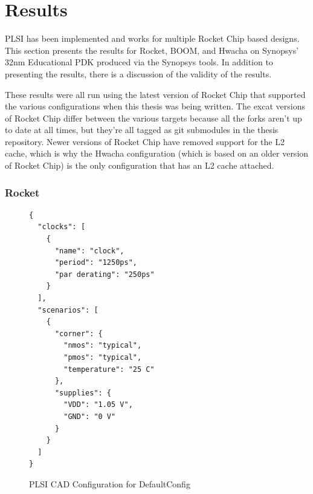 \documentclass{article}
\begin{document}
\chapter{Results}

PLSI has been implemented and works for multiple Rocket Chip based designs.
This section presents the results for Rocket, BOOM, and Hwacha on Synopsys'
32nm Educational PDK produced via the Synopsys tools.  In addition to
presenting the results, there is a discussion of the validity of the results.

These results were all run using the latest version of Rocket Chip that
supported the various configurations when this thesis was being written.  The
excat versions of Rocket Chip differ between the various targets because all
the forks aren't up to date at all times, but they're all tagged as git
submodules in the thesis repository.  Newer versions of Rocket Chip have
removed support for the L2 cache, which is why the Hwacha configuration (which
is based on an older version of Rocket Chip) is the only configuration that has
an L2 cache attached.

\subsection{Rocket}

\begin{figure}
  \begin{verbatim}
{
  "clocks": [
    {
      "name": "clock",
      "period": "1250ps",
      "par derating": "250ps"
    }
  ],
  "scenarios": [
    {
      "corner": {
        "nmos": "typical",
        "pmos": "typical",
        "temperature": "25 C"
      },
      "supplies": {
        "VDD": "1.05 V",
        "GND": "0 V"
      }
    }
  ]
}
\end{verbatim}
  \caption{PLSI CAD Configuration for DefaultConfig}
  \label{res:rocket-config}
\end{figure}
\end{document}
